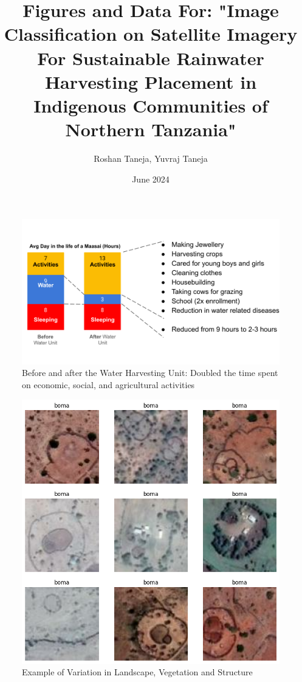 \documentclass{article}
\title{Figures and Data For: "Image Classification on Satellite Imagery For Sustainable Rainwater Harvesting Placement in Indigenous Communities of Northern Tanzania"}
\author{Roshan Taneja, Yuvraj Taneja}
\date{June 2024}
\begin{document}
\maketitle


\newpage

\begin{figure}[H]
    \centering
    \includegraphics[width=1\linewidth]{images/beforeandafterwhu.png}
    \caption{Before and after the Water Harvesting Unit: Doubled the time spent on economic, social, and agricultural activities}
    \label{fig:bef_aft_results}
\end{figure}

\begin{figure}[H]
    \centering
    \includegraphics[width=0.8\linewidth]{images/types of bomas.png}
    \caption{Example of Variation in Landscape, Vegetation and Structure}
    \label{fig:types_of_bomas}
\end{figure}
\end{document}
